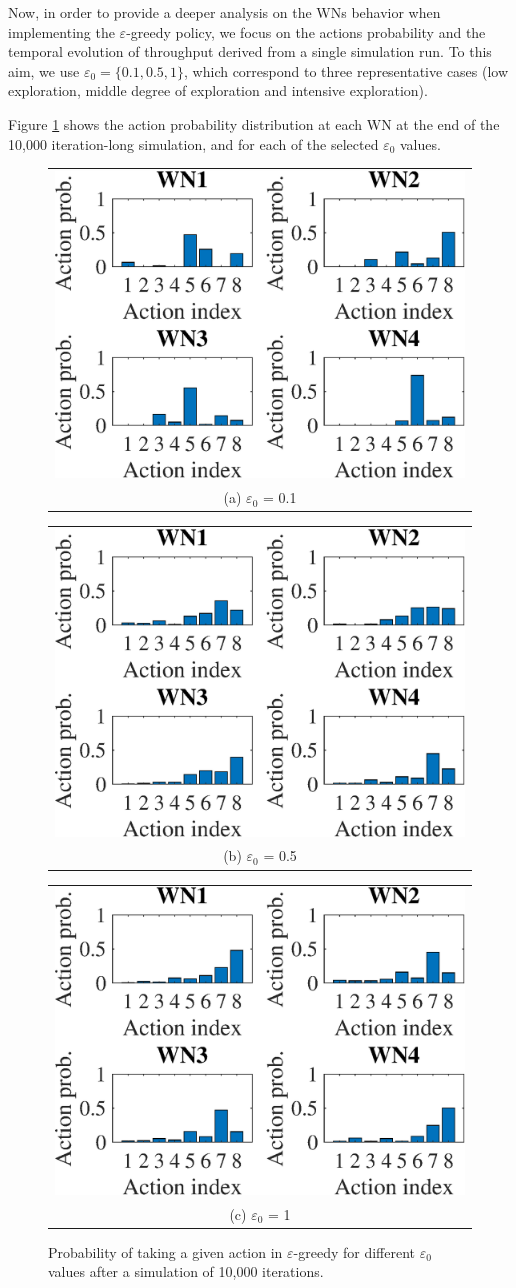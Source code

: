 \documentclass[10pt,journal,compsoc]{IEEEtran}
\begin{document}
	Now, in order to provide a deeper analysis on the WNs behavior when implementing the $\varepsilon$-greedy policy, we focus on the actions probability and the temporal evolution of throughput derived from a single simulation run. To this aim, we use $\varepsilon_0 = \{0.1, 0.5, 1\}$, which correspond to three representative cases (low exploration, middle degree of exploration and intensive exploration).	
	
	Figure \ref{fig:eg_actions_distr} shows the action probability distribution at each WN at the end of the 10,000 iteration-long simulation, and for each of the selected $\varepsilon_0$ values. 
	\begin{figure}
		\centering
		\begin{tabular}{@{}c@{}}
			\includegraphics[width=.25\textwidth]{images/NEW_actions_probability_e-greedy_e01} \\[\abovecaptionskip]
			\small (a) $\varepsilon_0$ = 0.1
			\label{fig:eg_e01_actions_distr}
		\end{tabular}	
		\hspace{\floatsep}	
		\begin{tabular}{@{}c@{}}
			\includegraphics[width=.25\textwidth]{images/NEW_actions_probability_e-greedy_e05} \\[\abovecaptionskip]
			\small (b) $\varepsilon_0$ = 0.5
			\label{fig:eg_e05_actions_distr}
		\end{tabular}
		\hspace{\floatsep}
		\begin{tabular}{@{}c@{}}
			\includegraphics[width=.25\textwidth]{images/NEW_actions_probability_e-greedy_e1} \\[\abovecaptionskip]
			\small (c) $\varepsilon_0$ = 1
			\label{fig:eg_1_actions_distr}
		\end{tabular}
		\caption{Probability of taking a given action in $\varepsilon$-greedy for different $\varepsilon_0$ values after a simulation of 10,000 iterations.}
		\label{fig:eg_actions_distr}
	\end{figure}
	
\end{document}
